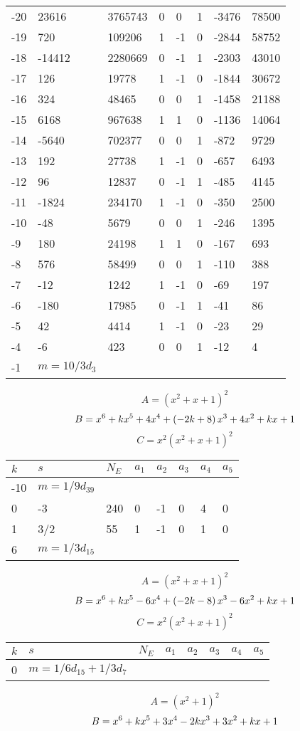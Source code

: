 \documentclass{amsart}
\begin{document}
\begin{longtable}{|l|l|l|lllll|}
-20&23616&3765743&0&0&1&-3476&78500\\
-19&720&109206&1&-1&0&-2844&58752\\
-18&-14412&2280669&0&-1&1&-2303&43010\\
-17&126&19778&1&-1&0&-1844&30672\\
-16&324&48465&0&0&1&-1458&21188\\
-15&6168&967638&1&1&0&-1136&14064\\
-14&-5640&702377&0&0&1&-872&9729\\
-13&192&27738&1&-1&0&-657&6493\\
-12&96&12837&0&-1&1&-485&4145\\
-11&-1824&234170&1&-1&0&-350&2500\\
-10&-48&5679&0&0&1&-246&1395\\
-9&180&24198&1&1&0&-167&693\\
-8&576&58499&0&0&1&-110&388\\
-7&-12&1242&1&-1&0&-69&197\\
-6&-180&17985&0&-1&1&-41&86\\
-5&42&4414&1&-1&0&-23&29\\
-4&-6&423&0&0&1&-12&4\\
-1&$m=10/3d_{3}$&&\multicolumn{5}{c|}{}\\
\hline
\end{longtable}
$$A=(x^2
 + x
 + 1)^{2}$$
$$B=x^6
 + k\*x^5
 + 4\*x^4
 + \left(-2\*k
 + 8\right) \*x^3
 + 4\*x^2
 + k\*x
 + 1$$
$$C=x^2(x^2
 + x
 + 1)^{2}$$
\begin{longtable}{|l|l|l|lllll|}
\hline
$k$ & $s$ & $N_E$ & $a_1$ & $a_2$ & $a_3$ & $a_4$ & $a_5$\\
\hline
-10&$m=1/9d_{39}$&&\multicolumn{5}{c|}{}\\
0&-3&240&0&-1&0&4&0\\
1&3/2&55&1&-1&0&1&0\\
6&$m=1/3d_{15}$&&\multicolumn{5}{c|}{}\\
\hline
\end{longtable}
$$A=(x^2
 + x
 + 1)^{2}$$
$$B=x^6
 + k\*x^5
 - 6\*x^4
 + \left(-2\*k
 - 8\right) \*x^3
 - 6\*x^2
 + k\*x
 + 1$$
$$C=x^2(x^2
 + x
 + 1)^{2}$$
\begin{longtable}{|l|l|l|lllll|}
\hline
$k$ & $s$ & $N_E$ & $a_1$ & $a_2$ & $a_3$ & $a_4$ & $a_5$\\
\hline
0&$m=1/6d_{15}+1/3d_{7}$&&\multicolumn{5}{c|}{}\\
\hline
\end{longtable}
$$A=(x^2
 + 1)^{2}$$
$$B=x^6
 + k\*x^5
 + 3\*x^4
 - 2\*k\*x^3
 + 3\*x^2
 + k\*x
 + 1$$
\end{document}
